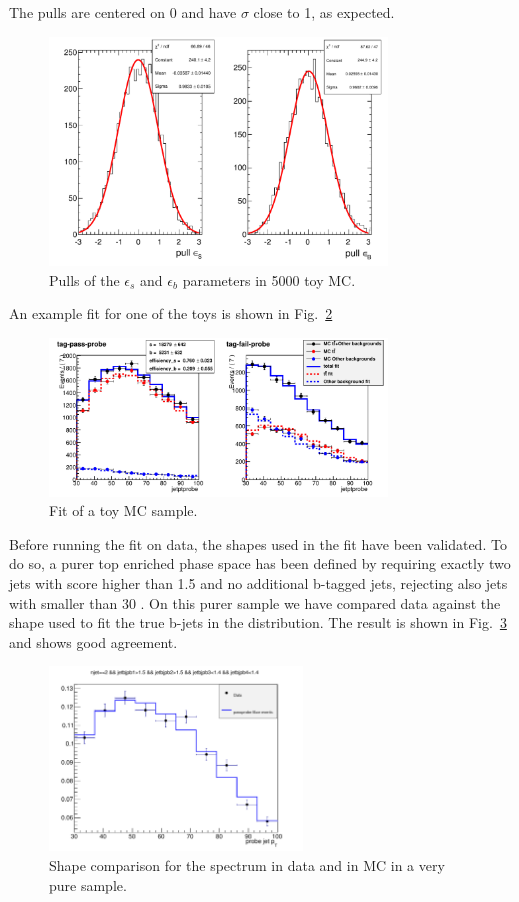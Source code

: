 The pulls are centered on 0 and have $\sigma$ close to 1, as expected.

\begin{figure}[t]
\centering
\includegraphics[width=0.8\textwidth]{images/pulls_mc.pdf}
\caption{Pulls of the $\epsilon_{s}$ and $\epsilon_{b}$ parameters in 5000 toy MC.\label{fig:pullstp}}
\end{figure}
An example fit for one of the toys is shown in  Fig.~\ref{fig:toy_tp}
\begin{figure}[b]
\centering
\includegraphics[width=0.8\textwidth]{images/mc_pt_probe_toy.pdf}
\caption{Fit of a toy MC sample.\label{fig:toy_tp}}
\end{figure}

Before running the fit on data, the shapes used in the fit have been validated. To do so, a purer top enriched phase space has been defined by requiring exactly two jets with \jpb score higher than 1.5 and no additional b-tagged jets, rejecting also jets with \pt smaller than 30 \GeV. On this purer sample we have compared data against the shape used to fit the true b-jets in the \tpp{} distribution. The result is shown in Fig.~\ref{fig:purett} and shows good agreement.
\begin{figure}[t]
\centering
\includegraphics[width=0.6\textwidth]{images/passprobe_data_mc.pdf}
\caption{Shape comparison for the \probe{} \pt spectrum in data and in MC in a very pure \ttbar sample.\label{fig:purett}}
\end{figure}


